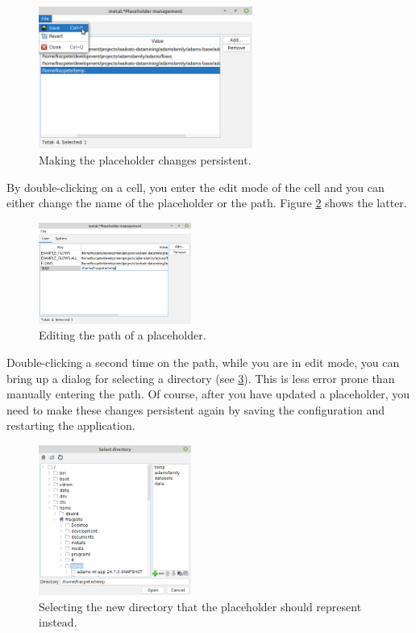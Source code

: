 \begin{figure}[htb]
  \centering
  \includegraphics[width=7.0cm]{images/placeholdermanagement-save.png}
  \caption{Making the placeholder changes persistent.}
  \label{placeholdermanagement-save}
\end{figure}

\clearpage
{}
By double-clicking on a cell, you enter the edit mode of the cell and you can
either change the name of the placeholder or the path. Figure
\ref{placeholdermanagement-edit1} shows the latter.
\begin{figure}[htb]
  \centering
  \includegraphics[width=5.0cm]{images/placeholdermanagement-edit1.png}
  \caption{Editing the path of a placeholder.}
  \label{placeholdermanagement-edit1}
\end{figure}

Double-clicking a second time on the path, while you are in edit mode, you can
bring up a dialog for selecting a directory (see
\ref{placeholdermanagement-edit2}). This is less error prone than manually
entering the path. Of course, after you have updated a placeholder, you need to
make these changes persistent again by saving the configuration and restarting
the application.
\begin{figure}[htb]
  \centering
  \includegraphics[width=5.0cm]{images/placeholdermanagement-edit2.png}
  \caption{Selecting the new directory that the placeholder should represent instead.}
  \label{placeholdermanagement-edit2}
\end{figure}

